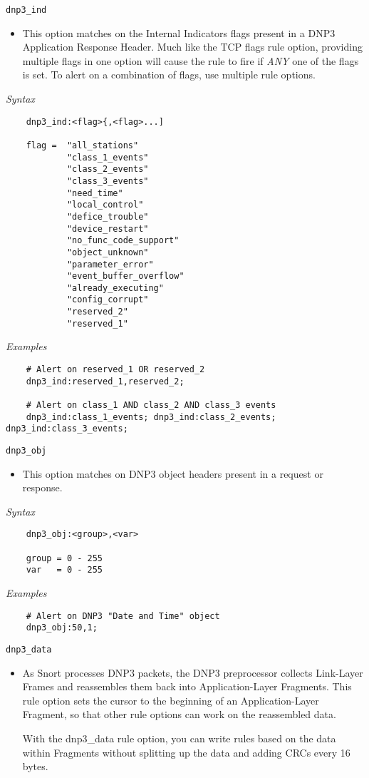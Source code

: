 \documentclass[english]{report}
\begin{document}
\texttt{dnp3\_ind}
\label{dnp3:dnp3_ind}
\begin{itemize}
 \item[] This option matches on the Internal Indicators flags present in a
     DNP3 Application Response Header. Much like the TCP flags rule option,
     providing multiple flags in one option will cause the rule to fire if \emph{ANY}
     one of the flags is set. To alert on a combination of flags, use multiple rule
     options.
\end{itemize}

\textit{Syntax}
\footnotesize
\begin{verbatim}
    dnp3_ind:<flag>{,<flag>...]

    flag =  "all_stations"
            "class_1_events"
            "class_2_events"
            "class_3_events"
            "need_time"
            "local_control"
            "defice_trouble"
            "device_restart"
            "no_func_code_support"
            "object_unknown"
            "parameter_error"
            "event_buffer_overflow"
            "already_executing"
            "config_corrupt"
            "reserved_2"
            "reserved_1"
\end{verbatim}
\normalsize
\textit{Examples}
\footnotesize
\begin{verbatim}
    # Alert on reserved_1 OR reserved_2
    dnp3_ind:reserved_1,reserved_2;

    # Alert on class_1 AND class_2 AND class_3 events
    dnp3_ind:class_1_events; dnp3_ind:class_2_events; dnp3_ind:class_3_events;
\end{verbatim}
\normalsize

\texttt{dnp3\_obj}
\label{dnp3:dnp3_obj}
\begin{itemize}
 \item[] This option matches on DNP3 object headers present in a request or response.
\end{itemize}

\textit{Syntax}
\footnotesize
\begin{verbatim}
    dnp3_obj:<group>,<var>

    group = 0 - 255
    var   = 0 - 255
\end{verbatim}
\normalsize
\textit{Examples}
\footnotesize
\begin{verbatim}
    # Alert on DNP3 "Date and Time" object
    dnp3_obj:50,1;
\end{verbatim}
\normalsize

\texttt{dnp3\_data}
\label{dnp3:dnp3_data}
\begin{itemize}
 \item[] As Snort processes DNP3 packets, the DNP3 preprocessor collects
     Link-Layer Frames and reassembles them back into Application-Layer Fragments.
     This rule option sets the cursor to the beginning of an Application-Layer
     Fragment, so that other rule options can work on the reassembled data.

     With the dnp3\_data rule option, you can write rules based on the data within
     Fragments without splitting up the data and adding CRCs every 16 bytes.
\end{itemize}
\end{document}
